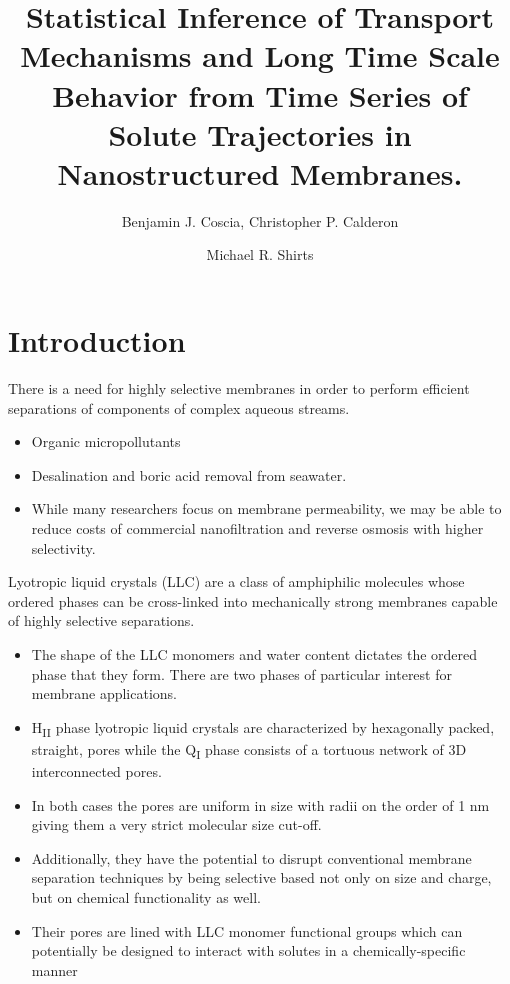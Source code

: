 \documentclass{article}
\title{Statistical Inference of Transport Mechanisms and Long Time Scale Behavior from Time Series 
       of Solute Trajectories in Nanostructured Membranes.}
\author{Benjamin J. Coscia, Christopher P. Calderon \and Michael R. Shirts}
\begin{document}
  \graphicspath{{./figures/}}
  \maketitle
  

  \section{Introduction}
  
  There is a need for highly selective membranes in order to perform efficient 
  separations of components of complex aqueous streams.
  \begin{itemize}
    \item Organic micropollutants
    \item Desalination and boric acid removal from seawater.
    \item While many researchers focus on membrane permeability, we may be 
    able to reduce costs of commercial nanofiltration and reverse osmosis with
    higher selectivity.~\cite{werber_materials_2016}
  \end{itemize}


  Lyotropic liquid crystals (LLC) are a class of amphiphilic molecules whose ordered phases
  can be cross-linked into mechanically strong membranes capable of highly selective
  separations.
  \begin{itemize}
    \item The shape of the LLC monomers and water content dictates the ordered phase 
    that they form. There are two phases of particular interest for membrane applications.
  	\item H\textsubscript{II} phase lyotropic liquid crystals are characterized by 
  	hexagonally packed, straight, pores while the Q\textsubscript{I} phase consists of
  	a tortuous network of 3D interconnected pores. 
  	\item In both cases the pores are uniform in size with radii on the order of 1 nm
  	giving them a very strict molecular size cut-off.
	\item Additionally, they have the potential to disrupt conventional membrane separation
	techniques by being selective based not only on size and charge, but on chemical
	functionality as well.
	\item Their pores are lined with LLC monomer functional groups which can potentially
	be designed to interact with solutes in a chemically-specific manner
  \end{itemize}
\end{document}
